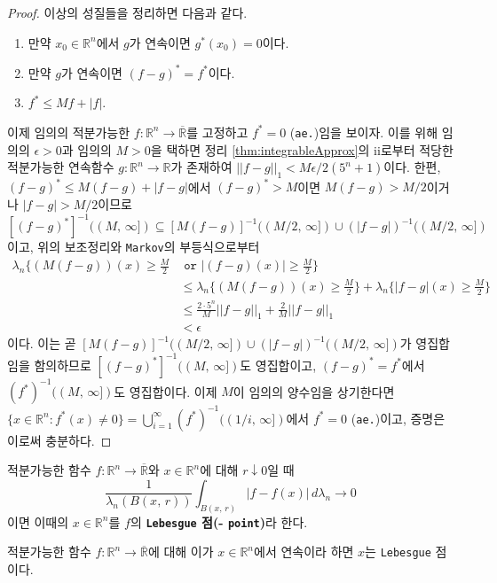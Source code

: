 \begin{proof}
    이상의 성질들을 정리하면 다음과 같다. 
    \begin{enumerate}
        \item 만약 $x_0\in\mathbb{R}^n$에서 $g$가 연속이면 $g^*(x_0)=0$이다.
        \item 만약 $g$가 연속이면 $(f-g)^*=f^*$이다.
        \item $f^*\leq Mf+|f|$.
    \end{enumerate}
    이제 임의의 적분가능한 $f:\mathbb{R}^n\to\overline{\mathbb{R}}$를 고정하고 $f^*=0$ (\texttt{ae.})임을 보이자. 이를 위해 임의의 $\epsilon>0$과 임의의 $M>0$을 택하면 정리 \ref{thm:integrableApprox}의 ii로부터 적당한 적분가능한 연속함수 $g:\mathbb{R}^n\to\mathbb{R}$가 존재하여 $||f-g||_1<M\epsilon/2(5^n+1)$이다. 한편, $(f-g)^*\leq M(f-g)+|f-g|$에서 $(f-g)^*>M$이면 $M(f-g)>M/2$이거나 $|f-g|>M/2$이므로 $[(f-g)^*]^{-1}((M,\,\infty])\subseteq[M(f-g)]^{-1}((M/2,\,\infty])\cup(|f-g|)^{-1}((M/2,\,\infty])$이고, 위의 보조정리와 \texttt{Markov}의 부등식으로부터
    \begin{align*}
        \lambda_n\bigg\{(M(f-g))(x)\geq\frac{M}{2}&\texttt{ or }|(f-g)(x)|\geq\frac{M}{2}\bigg\}\\
        &\leq\lambda_n\bigg\{(M(f-g))(x)\geq\frac{M}{2}\bigg\}+\lambda_n\bigg\{|f-g|(x)\geq\frac{M}{2}\bigg\}\\
        &\leq\frac{2\cdot5^n}{M}||f-g||_1+\frac{2}{M}||f-g||_1\\
        &<\epsilon
    \end{align*}
    이다. 이는 곧 $[M(f-g)]^{-1}((M/2,\,\infty])\cup(|f-g|)^{-1}((M/2,\,\infty])$가 영집합임을 함의하므로 $[(f-g)^*]^{-1}((M,\,\infty])$도 영집합이고, $(f-g)^*=f^*$에서 $(f^*)^{-1}((M,\,\infty])$도 영집합이다. 이제 $M$이 임의의 양수임을 상기한다면 $\{x\in\mathbb{R}^n:f^*(x)\ne0\}=\bigcup_{i=1}^\infty(f^*)^{-1}((1/i,\,\infty])$에서 $f^*=0$ (\texttt{ae.})이고, 증명은 이로써 충분하다.
\end{proof}

\begin{definition}
    적분가능한 함수 $f:\mathbb{R}^n\to\overline{\mathbb{R}}$와 $x\in\mathbb{R}^n$에 대해 $r\downarrow0$일 때
    \begin{equation*}
        \frac{1}{\lambda_n(B(x,\,r))}\int_{B(x,\,r)}|f-f(x)|\,d\lambda_n\to 0
    \end{equation*}
    이면 이때의 $x\in\mathbb{R}^n$를 $f$의 \textbf{\texttt{Lebesgue} 점(- \texttt{point})}라 한다.
\end{definition}

\begin{corollary}\label{cor:differentiableLebesguePoint}
    적분가능한 함수 $f:\mathbb{R}^n\to\overline{\mathbb{R}}$에 대해 이가 $x\in\mathbb{R}^n$에서 연속이라 하면 $x$는 \texttt{Lebesgue} 점이다.
\end{corollary}

